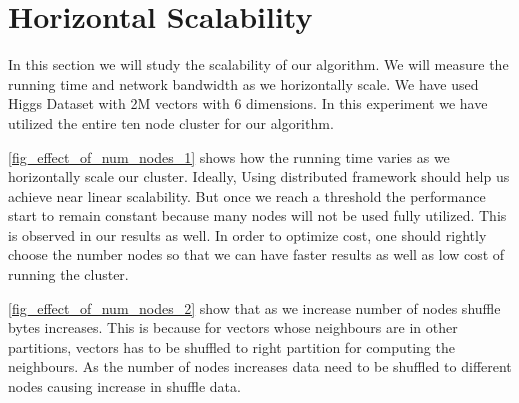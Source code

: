 \section{Horizontal Scalability}
In this section we will study the scalability of our algorithm. We
will measure the running time and network bandwidth as we horizontally
scale.
We have used Higgs Dataset with 2M vectors with 6 dimensions. In this experiment we
have utilized the entire ten node cluster for our
algorithm.

\cref{fig_effect_of_num_nodes_1} shows how
the running time varies as we horizontally scale our cluster. Ideally,
Using distributed framework should help us achieve near linear
scalability. But once we reach a threshold the performance start to
remain constant because many nodes will not be used fully
utilized. This is observed in our results as well. In order to
optimize cost, one should rightly choose the number nodes so that we can have
faster results as well as low cost of running the cluster.

\cref{fig_effect_of_num_nodes_2} show that as we increase number of
nodes shuffle bytes increases. This is because for vectors whose
neighbours are in other partitions, vectors has to be shuffled to
right partition for computing the neighbours. As the number of nodes
increases data need to be shuffled to different nodes causing increase
in shuffle data.

